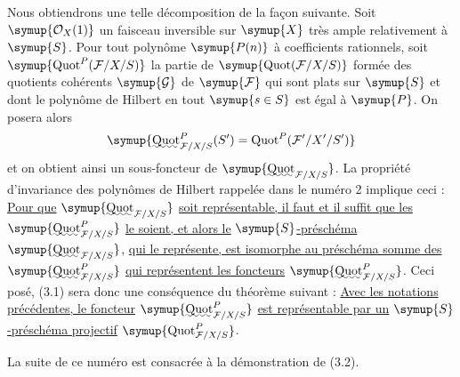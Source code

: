 Nous obtiendrons une telle décomposition de la façon suivante. Soit
$\symup{\mathcal O_X(1)}$ un faisceau inversible sur $\symup{X}$ très ample relativement à
$\symup{S}$. Pour tout polynôme $\symup{P(n)}$ à coefficients rationnels, soit
$\symup{\operatorname{Quot}^P(\mathcal F/X/S)}$ la partie de
$\symup{\operatorname{Quot}(\mathcal F/X/S)}$ formée des quotients cohérents
$\symup{\mathcal G}$ de $\symup{\mathcal F}$ qui sont plats sur $\symup{S}$ et dont le polynôme de
Hilbert en tout $\symup{s\in S}$ est égal à $\symup{P}$. On posera alors
\[
\symup{\mathop{\text{\uwave{Quot}}}\nolimits^P_{\mathcal F/X/S}(S')
=\operatorname{Quot}^P(\mathcal F'/X'/S')}
\]
et on obtient ainsi un sous-foncteur de
$\symup{\mathop{\text{\uwave{Quot}}}\nolimits_{\mathcal F/X/S}}$. La propriété d'invariance
des polynômes de Hilbert rappelée dans le numéro 2 implique ceci : \uline{Pour que}
$\symup{\mathop{\text{\uwave{Quot}}}\nolimits_{\mathcal F/X/S}}$ \uline{soit représentable, il faut
et il suffit que les}
$\symup{\mathop{\text{\uwave{Quot}}}\nolimits^P_{\mathcal F/X/S}}$ \uline{le soient, et alors le}
$\symup{S}$\uline{-préschéma} $\symup{\mathop{\text{\uwave{Quot}}}\nolimits_{\mathcal F/X/S}}$, \uline{qui le représente, est
isomorphe au préschéma somme des}
$\symup{\mathop{\text{\uwave{Quot}}}\nolimits^P_{\mathcal F/X/S}}$ \uline{qui représentent les foncteurs}
$\symup{\mathop{\text{\uwave{Quot}}}\nolimits^P_{\mathcal F/X/S}}$. Ceci posé, (3.1) sera
donc une conséquence du théorème suivant :
 \uline{Avec les notations précédentes, le foncteur}
$\symup{\mathop{\text{\uwave{Quot}}}\nolimits^P_{\mathcal F/X/S}}$ \uline{est représentable par un}
$\symup{S}$\uline{-préschéma projectif} $\symup{\operatorname{Quot}^P_{\mathcal F/X/S}}$.

La suite de ce numéro est consacrée à la démonstration de (3.2).

